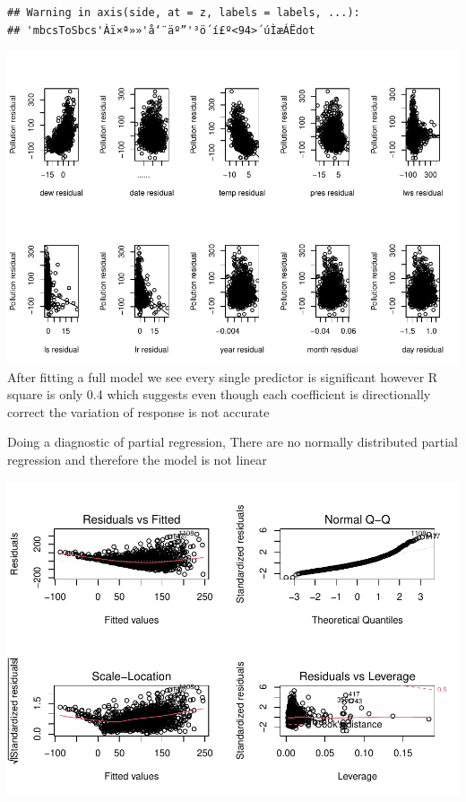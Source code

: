\documentclass[
]{article}
\begin{document}
\begin{verbatim}
## Warning in axis(side, at = z, labels = labels, ...):
## 'mbcsToSbcs'Àï×ª»»'å‘¨äº”'³ö´í£º<94>´úÌæÁËdot
\end{verbatim}

\includegraphics{Final_Project_1_files/figure-latex/unnamed-chunk-7-2.pdf}
After fitting a full model we see every single predictor is significant
however R square is only 0.4 which suggests even though each coefficient
is directionally correct the variation of response is not accurate

Doing a diagnostic of partial regression, There are no normally
distributed partial regression and therefore the model is not linear

\includegraphics{Final_Project_1_files/figure-latex/unnamed-chunk-9-1.pdf}
\end{document}
